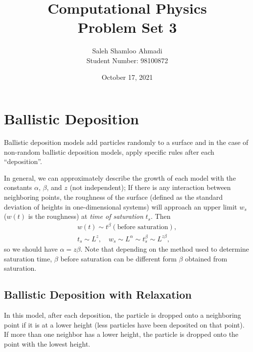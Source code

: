 \documentclass[12pt,a4paper]{article}
\title{Computational Physics\\Problem Set 3}
\author{Saleh Shamloo Ahmadi\\Student Number: 98100872}
\date{October 17, 2021}
\begin{document}
	\maketitle
    \section{Ballistic Deposition}
    Ballistic deposition models add particles randomly to a surface and in the case of non-random
    ballistic deposition models, apply specific rules after each \enquote{deposition}.

    In general, we can approximately describe the growth of each model with the constants $\alpha$, $\beta$,
    and $z$ (not independent); If there is any interaction between neighboring points, the roughness of the
    surface (defined as the standard deviation of heights in one-dimensional systems) will approach an upper limit
    $w_s$ ($w(t)$ is the roughness) at \emph{time of saturation} $t_s$. Then
    \begin{gather}
        w(t) \sim t^\beta (\text{before saturation}), \\
        t_s \sim L^z, \quad w_s \sim L^\alpha \sim t_s^\beta \sim L^{z\beta},
    \end{gather}
    so we should have $\alpha = z\beta$. Note that depending on the method used to determine saturation time, $\beta$
    before saturation can be different form $\beta$ obtained from saturation.

    \subsection{Ballistic Deposition with Relaxation}
    In this model, after each deposition, the particle is dropped onto a neighboring point if it is at a lower height
    (less particles have been deposited on that point). If more than one neighbor has a lower height, the particle is
    dropped onto the point with the lowest height.
\end{document}
